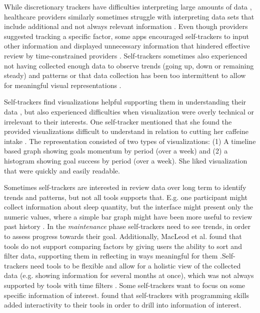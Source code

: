 While discretionary trackers have difficulties interpreting large amounts of data \citep{Choe2014}, healthcare providers similarly sometimes struggle with interpreting data sets that include additional and not always relevant information \citep{Chung2015, Chung2016}. Even though providers suggested tracking a specific factor, some apps encouraged self-trackers to input other information and displayed unnecessary information that hindered effective review by time-constrained providers \citep{Chung2016}. Self-trackers sometimes also experienced not having collected enough data to observe trends (going up, down or remaining steady) and patterns \citep{Li2011} or that data collection has been too intermittent to allow for meaningful visual representations \citep{Li2010}. 

Self-trackers find visualizations helpful supporting them in understanding their data \citep{Choe2014}, but also experienced difficulties when visualization were overly technical or irrelevant to their interests. One self-tracker mentioned that she found the provided visualizations difficult to understand in relation to cutting her caffeine intake \citep{MacLeod2014}. The representation consisted of two types of visualizations: (1) A timeline based graph showing goals momentum by period (over a week) and (2) a histogram showing goal success by period (over a week). She liked visualization that were quickly and easily readable.

Sometimes self-trackers are interested in review data over long term to identify trends and patterns, but not all tools supports that. E.g. one participant might collect information about sleep quantity, but the interface might present only the numeric values, where a simple bar graph might have been more useful to review past history \citep{Li2011}. In the \textit{maintenance} phase self-trackers need to see trends, in order to assess progress towards their goal. Additionally, MacLeod et al. found that tools do not support comparing factors by giving users the ability to sort and filter data, supporting them in reflecting in ways meaningful for them \citep{MacLeod2014}.Self-trackers need tools to be flexible and allow for a holistic view of the collected data (e.g. showing information for several months at once), which was not always supported by tools with time filters \citep{Li2010}. Some self-trackers want to focus on some specific information of interest. \citep{Whooley2014} found that self-trackers with programming skills added interactivity to their tools in order to drill into information of interest.

